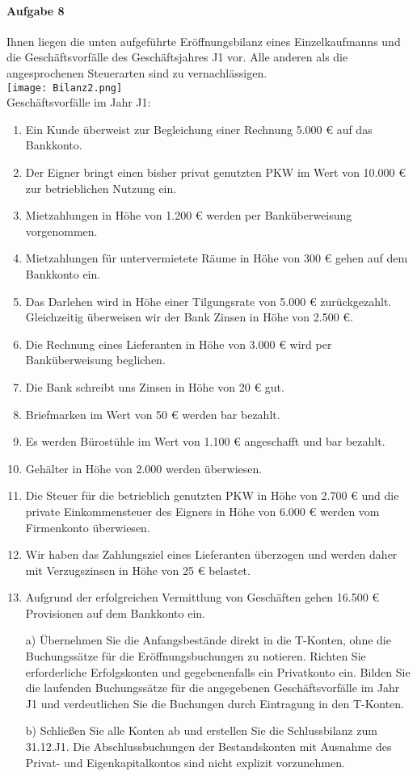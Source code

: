 \documentclass[paper=a4, fontsize=11pt]{scrartcl}
\numberwithin{equation}{section}
\numberwithin{figure}{section}
\numberwithin{table}{section}
\begin{document}
\paragraph{Aufgabe 8}
Ihnen liegen die unten aufgeführte Eröffnungsbilanz eines Einzelkaufmanns und die Geschäftsvorfälle des Geschäftsjahres J1 vor. Alle anderen als die angesprochenen Steuerarten sind zu vernachlässigen. \\
\texttt{[image: Bilanz2.png]} \\
Geschäftsvorfälle im Jahr J1:
\begin{enumerate}
\item Ein Kunde überweist zur Begleichung einer Rechnung 5.000 € auf das Bankkonto. 
\item Der Eigner bringt einen bisher privat genutzten PKW im Wert von 10.000 € zur betrieblichen Nutzung ein. 
\item Mietzahlungen in Höhe von 1.200 € werden per Banküberweisung vorgenommen. 
\item Mietzahlungen für untervermietete Räume in Höhe von 300 € gehen auf dem Bankkonto ein. 
\item Das Darlehen wird in Höhe einer Tilgungsrate von 5.000 € zurückgezahlt. Gleichzeitig überweisen wir der Bank Zinsen in Höhe von 2.500 €. 
\item Die Rechnung eines Lieferanten in Höhe von 3.000 € wird per Banküberweisung beglichen. 
\item Die Bank schreibt uns Zinsen in Höhe von 20 € gut. 
\item Briefmarken im Wert von 50 € werden bar bezahlt. 
\item Es werden Bürostühle im Wert von 1.100 € angeschafft und bar bezahlt. 
\item Gehälter in Höhe von 2.000 werden überwiesen. 
\item Die Steuer für die betrieblich genutzten PKW in Höhe von 2.700 € und die private Einkommensteuer des Eigners in Höhe von 6.000 € werden vom Firmenkonto überwiesen. 
\item Wir haben das Zahlungsziel eines Lieferanten überzogen und werden daher mit Verzugszinsen in Höhe von 25 € belastet. 
\item Aufgrund der erfolgreichen Vermittlung von Geschäften gehen 16.500 € Provisionen auf dem Bankkonto ein. 
\end{enumerate}
\begin{itemize}
\item[a)] Übernehmen Sie die Anfangsbestände direkt in die T-Konten, ohne die Buchungssätze für die Eröffnungsbuchungen zu notieren. Richten Sie erforderliche Erfolgskonten und gegebenenfalls ein Privatkonto ein. Bilden Sie die laufenden Buchungssätze für die angegebenen Geschäftsvorfälle im Jahr J1 und verdeutlichen Sie die Buchungen durch Eintragung in den T-Konten. 
\item[b)] Schließen Sie alle Konten ab und erstellen Sie die Schlussbilanz zum 31.12.J1. Die Abschlussbuchungen der Bestandskonten mit Ausnahme des Privat- und Eigenkapitalkontos sind nicht explizit vorzunehmen. 
\end{itemize}
\end{document}
